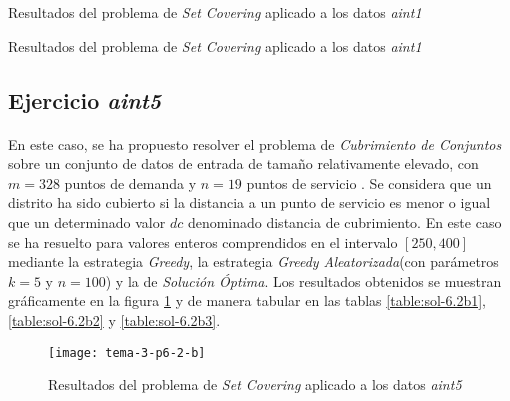 \documentclass[spanish]{article}
\begin{document}
			\begin{table}[h]
				\begin{center}
				\end{center}
				\caption{Resultados del problema de \emph{Set Covering} aplicado a los datos \emph{aint1}}
				\label{table:sol-6.2a2}
			\end{table}

			\begin{table}[h]
				\begin{center}
				\end{center}
				\caption{Resultados del problema de \emph{Set Covering} aplicado a los datos \emph{aint1}}
				\label{table:sol-6.2a3}
			\end{table}

		\subsection{Ejercicio \emph{aint5}}
		\label{sec:e-6.2b}

		\paragraph{}
		En este caso, se ha propuesto resolver el problema de \emph{Cubrimiento de Conjuntos} sobre un conjunto de datos de entrada de tamaño relativamente elevado, con $m = 328$ puntos de demanda y $n=19$ puntos de servicio . Se considera que un distrito ha sido cubierto si la distancia a un punto de servicio es menor o igual que un determinado valor $dc$ denominado distancia de cubrimiento. En este caso se ha resuelto para valores enteros comprendidos en el intervalo $[250, 400]$ mediante la estrategia \emph{Greedy}, la estrategia \emph{Greedy Aleatorizada}(con parámetros $k=5$ y $n=100$)  y la de \emph{Solución Óptima}. Los resultados obtenidos se muestran gráficamente en la figura \ref{fig:sol-6.2b} y de manera tabular en las tablas \ref{table:sol-6.2b1}, \ref{table:sol-6.2b2} y \ref{table:sol-6.2b3}.

			\begin{figure}[h]
				\begin{center}
					\texttt{[image: tema-3-p6-2-b]}
				\end{center}
				\caption{Resultados del problema de \emph{Set Covering} aplicado a los datos \emph{aint5}}
				\label{fig:sol-6.2b}
			\end{figure}
\end{document}
